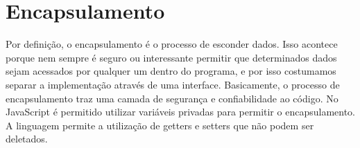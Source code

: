 	\section{Encapsulamento}	
	Por definição, o encapsulamento é o processo de esconder dados. Isso acontece porque nem sempre é seguro ou interessante permitir que determinados dados sejam acessados por qualquer um dentro do programa, e por isso costumamos separar a implementação através de uma interface. Basicamente, o processo de encapsulamento traz uma camada de segurança e confiabilidade ao código. No JavaScript é permitido utilizar variáveis privadas para permitir o encapsulamento. A linguagem permite a utilização de getters e setters que não podem ser deletados.

	
    
